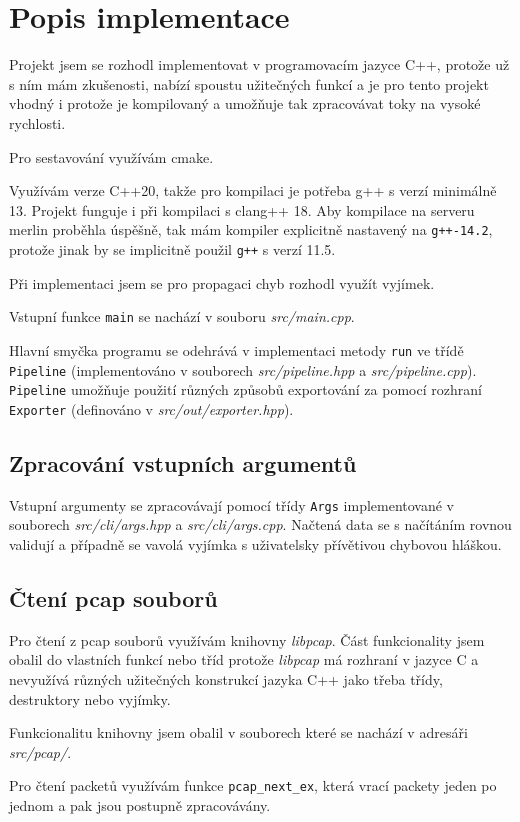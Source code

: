 \documentclass{article}
\begin{document}
\section{Popis implementace}
Projekt jsem se rozhodl implementovat v programovacím jazyce C++, protože už s
ním mám zkušenosti, nabízí spoustu užitečných funkcí a je pro tento projekt
vhodný i protože je kompilovaný a umožňuje tak zpracovávat toky na vysoké
rychlosti.

Pro sestavování využívám cmake.

Využívám verze C++20, takže pro kompilaci je potřeba g++ s verzí minimálně 13.
Projekt funguje i při kompilaci s clang++ 18. Aby kompilace na serveru merlin
proběhla úspěšně, tak mám kompiler explicitně nastavený na \verb|g++-14.2|,
protože jinak by se implicitně použil \verb|g++| s verzí 11.5.

Při implementaci jsem se pro propagaci chyb rozhodl využít vyjímek.

Vstupní funkce \verb|main| se nachází v souboru \textit{src/main.cpp}.

Hlavní smyčka programu se odehrává v implementaci metody \verb|run| ve třídě
\verb|Pipeline| (implementováno v souborech \textit{src/pipeline.hpp} a
\textit{src/pipeline.cpp}). \verb|Pipeline| umožňuje použití různých způsobů
exportování za pomocí rozhraní \verb|Exporter| (definováno v
\textit{src/out/exporter.hpp}).

\subsection{Zpracování vstupních argumentů}
Vstupní argumenty se zpracovávají pomocí třídy \verb|Args| implementované v
souborech \textit{src/cli/args.hpp} a \textit{src/cli/args.cpp}. Načtená data
se s načítáním rovnou validují a případně se vavolá vyjímka s uživatelsky
přívětivou chybovou hláškou.

\subsection{Čtení pcap souborů}
Pro čtení z pcap souborů využívám knihovny \textit{libpcap}. Část funkcionality
jsem obalil do vlastních funkcí nebo tříd protože \textit{libpcap} má rozhraní
v jazyce C a nevyužívá různých užitečných konstrukcí jazyka C++ jako třeba
třídy, destruktory nebo vyjímky.

Funkcionalitu knihovny jsem obalil v souborech které se nachází v adresáři
\textit{src/pcap/}.

Pro čtení packetů využívám funkce \verb|pcap_next_ex|, která vrací packety
jeden po jednom a pak jsou postupně zpracovávány.
\end{document}
